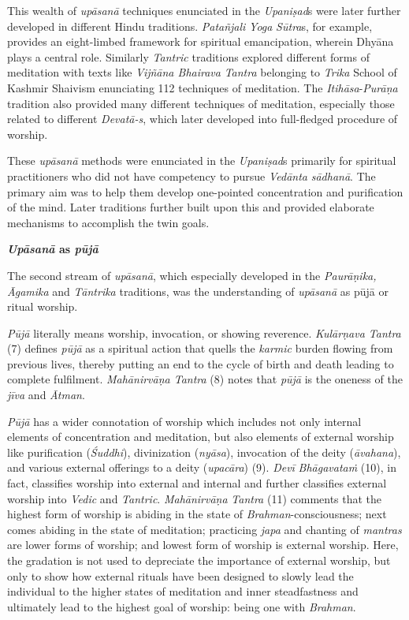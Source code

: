This wealth of \emph{upāsanā} techniques enunciated in the \emph{Upaniṣad}s were later further developed in different Hindu traditions. \emph{Patañjali} \emph{Yoga} \emph{Sūtra}s, for example, provides an eight-limbed framework for spiritual emancipation, wherein Dhyāna plays a central role. Similarly \emph{Tantric} traditions explored different forms of meditation with texts like \emph{Vijñāna Bhairava} \emph{Tantra} belonging to \emph{Trika} School of Kashmir Shaivism enunciating 112 techniques of meditation. The \emph{Itihāsa}-\emph{Purāṇa} tradition also provided many different techniques of meditation, especially those related to different \emph{Devatā-s}, which later developed into full-fledged procedure of worship.
\newpage

These \emph{upāsanā} methods were enunciated in the \emph{Upaniṣad}s primarily for spiritual practitioners who did not have competency to pursue \emph{Vedānta} \emph{sādhanā}. The primary aim was to help them develop one-pointed concentration and purification of the mind. Later traditions further built upon this and provided elaborate mechanisms to accomplish the twin goals.
\medskip

\textbf{\emph{Upāsanā} as \emph{pūjā}}

The second stream of \emph{upāsanā}, which especially developed in the \emph{Paurāṇika, Āgamika} and \emph{Tāntrika} traditions, was the understanding of \emph{upāsanā} as pūjā or ritual worship.

\emph{Pūjā} literally means worship, invocation, or showing reverence. \emph{Kulārṇava Tantra} (7) defines \emph{pūjā} as a spiritual action that quells the \emph{karmic} burden flowing from previous lives, thereby putting an end to the cycle of birth and death leading to complete fulfilment. \emph{Mahānirvāṇa Tantra} (8) notes that \emph{pūjā} is the oneness of the \emph{jīva} and \emph{Ātman}.

\emph{Pūjā} has a wider connotation of worship which includes not only internal elements of concentration and meditation, but also elements of external worship like purification (\emph{Śuddhi}), divinization (\emph{nyāsa}), invocation of the deity (\emph{āvahana}), and various external offerings to a deity (\emph{upacāra}) (9). \emph{Devī} \emph{Bhāgavataṁ} (10), in fact, classifies worship into external and internal and further classifies external worship into \emph{Vedic} and \emph{Tantric}. \emph{Mahānirvāṇa} \emph{Tantra} (11) comments that the highest form of worship is abiding in the state of \emph{Brahman}-consciousness; next comes abiding in the state of meditation; practicing \emph{japa} and chanting of \emph{mantras} are lower forms of worship; and lowest form of worship is external worship. Here, the gradation is not used to depreciate the importance of external worship, but only to show how external rituals have been designed to slowly lead the individual to the higher states of meditation and inner steadfastness and ultimately lead to the highest goal of worship: being one with \emph{Brahman}.

